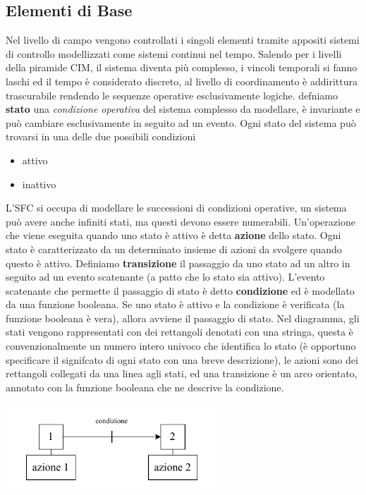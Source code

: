 \documentclass[10pt, letterpaper]{report}
\begin{document}
\subsection{Elementi di Base}
Nel livello di campo vengono controllati i singoli elementi tramite appositi sistemi di controllo modellizzati come sistemi continui nel tempo. Salendo per i livelli della piramide CIM, il sistema diventa più complesso, i vincoli temporali si fanno laschi ed il tempo è considerato discreto, al livello di coordinamento è addirittura trascurabile rendendo le sequenze operative esclusivamente logiche.\acc 
{} defniamo \textbf{stato} una \textit{condizione operativa} del sistema complesso da modellare, è invariante e può cambiare esclusivamente in seguito ad un evento. Ogni stato del sistema può trovarsi in una delle due possibili condizioni\begin{itemize}
    \item attivo 
    \item inattivo 
\end{itemize}
L'SFC si occupa di modellare le successioni di condizioni operative, un sistema può avere anche infiniti stati, ma questi devono essere numerabili.\acc 
{} Un'operazione che viene eseguita quando uno stato è attivo è detta \textbf{azione} dello stato. Ogni stato è caratterizzato da un determinato insieme di azioni da svolgere quando questo è attivo.\acc 
{} Definiamo \textbf{transizione} il passaggio da uno stato ad un altro in seguito ad un evento scatenante (a patto che lo stato sia attivo).\acc 
{} L'evento scatenante che permette il passaggio di stato è detto \textbf{condizione} ed è modellato da una funzione booleana. Se uno stato è attivo e la condizione è verificata (la funzione booleana è vera), allora avviene il passaggio di stato.\acc 
Nel diagramma, gli stati vengono rappresentati con dei rettangoli denotati con una stringa, questa è convenzionalmente un numero intero univoco che identifica lo stato (è opportuno specificare il signifcato di ogni stato con una breve descrizione), le azioni sono dei rettangoli collegati da una linea agli stati, ed una transizione è un arco orientato, annotato con la funzione booleana che ne descrive la condizione.\begin{center}
    \includegraphics[width=0.6\textwidth ]{images/SFC.pdf}
\end{center}
\end{document}
